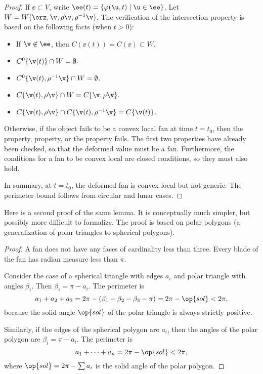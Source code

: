 \begin{proof}
  If $\ee\subset V$,
write $\ee(t) = \{\varphi(\u,t) \mid \u\in \ee\}$.  Let $W
=W(\orz,\v,\rho\v,\rho^{-1}\v)$. The verification of the intersection
property is based on the following facts (when $t>0$):
\begin{itemize} 
\item If $\v\not\in \ee$, then $C(\ee(t))=C(\ee)\subset W$.
\item $C^0\{\v(t)\} \cap W = \emptyset$.
\item $C^0\{\v(t),\rho^{-1}\v\}\cap W = \emptyset$.
\item $C\{\v(t),\rho\v\}\cap W = C\{\v,\rho\v\}.$
\item $C\{\v(t),\rho\v\}\cap C\{\v(t),\rho^{-1}\v\} = C\{\v(t)\}$.
\end{itemize}

Otherwise, if the object fails to be a convex local fan at time
$t=t_0$, then the  property, 
property, or the  property fails.  The first two
properties have already been checked, so that the deformed value must
be a fan.  Furthermore, the conditions for a fan to be convex local
are closed conditions, so they must also hold.

In summary, at $t=t_0$, the deformed fan is convex local but not
generic.  The perimeter bound follows from circular and lunar cases.
\end{proof}

Here is a second proof of the same lemma.  It is conceptually much
simpler, but possibly more difficult to formalize.  The proof is based
on polar polygons (a generalization of polar triangles to spherical
polygons).

\begin{proof} A fan does not have any faces of cardinality less than
three.  Every blade of the fan has radian measure less than $\pi$.
%

Consider the case of a spherical triangle with edges $a_i$
and polar triangle with angles $\beta_i$. Then $\beta_i=\pi-a_i$.
The perimeter is 
\begin{displaymath}a_1+a_2+a_3 = 2\pi - (\beta_1 -\beta_2 -
\beta_3-\pi)= 2\pi-\op{sol} < 2\pi,\end{displaymath} because the
solid angle $\op{sol}$ of the polar triangle is always strictly
positive.  %

Similarly, if the edges of the spherical polygon are
$a_i$, then the angles of the polar polygon are $\beta_i = \pi-a_i$.
The perimeter is
\begin{displaymath}
a_1+\cdots+a_n  = 2\pi- \op{sol}< 2\pi,
\end{displaymath}
where $\op{sol} = 2\pi-\sum a_i$ is the solid angle of the polar polygon.
%
\end{proof}


